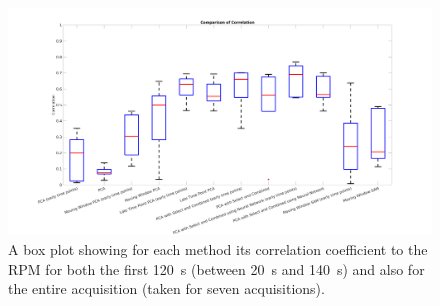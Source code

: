     \begin{figure}
        \vspace{-0.5cm}
        
        \centering
        
        \includegraphics[width=1.0\linewidth]{figures/box_plot.png}
        
        \vspace{-0.4cm}
        
        \captionsetup{singlelinecheck=false, justification=centering}
        \caption{
        \scriptsize
        A box plot showing for each method its correlation coefficient to the \gls{RPM} for both the first \SI{120}{\second} (between \SI{20}{\second} and \SI{140}{\second}) and also for the entire acquisition (taken for seven acquisitions).}
        
        \label{fig:box_plot}
        
    \end{figure}
    
